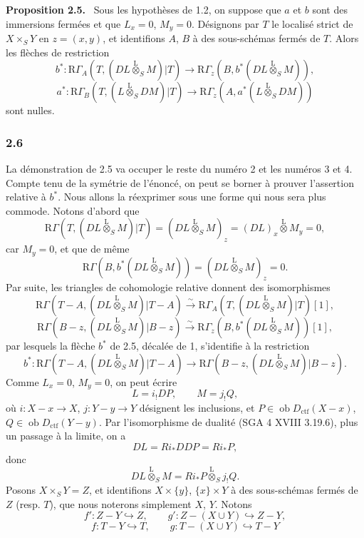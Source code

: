 \documentclass[11pt]{article}
\newenvironment{statement}[1]{\par\medskip\noindent\textbf{#1.}\ }{\par\medskip}
\providecommand{\lten}{\overset{\mathrm L}{\otimes}}
\providecommand{\Ob}{\operatorname{ob}}
\providecommand{\lten}{\overset{\mathrm L}{\otimes}}
\providecommand{\lten}{\overset{\mathrm L}{\otimes}}
\providecommand{\Ob}{\operatorname{ob}}
\providecommand{\lten}{\overset{\mathrm L}{\otimes}}
\providecommand{\lten}{\overset{\mathrm L}{\otimes}}
\providecommand{\Ob}{\operatorname{Ob}}
\providecommand{\lten}{\overset{\mathrm L}{\otimes}}
\providecommand{\Ob}{\operatorname{ob}}
\providecommand{\Ob}{\operatorname{Ob}}
\providecommand{\lten}{\overset{\mathrm L}{\otimes}}
\begin{document}
\begin{statement}{Proposition 2.5}
Sous les hypothèses de 1.2, on suppose que $a$ et $b$ sont des immersions fermées et que $L_x=0$, $M_y=0$. Désignons par $T$ le localisé strict de $X\times_SY$ en $z=(x,y)$, et identifions $A$, $B$ à des sous-schémas fermés de $T$. Alors les flèches de restriction
\[
b^*:\mathrm R\Gamma_A(T,(DL\lten_SM)|T)
 \longrightarrow \mathrm R\Gamma_z(B,b^*(DL\lten_SM)),
\]
\[
a^*:\mathrm R\Gamma_B(T,(L\lten_SDM)|T)
 \longrightarrow \mathrm R\Gamma_z(A,a^*(L\lten_SDM))
\]
sont nulles.
\end{statement}

\subsubsection*{2.6}
La démonstration de 2.5 va occuper le reste du numéro 2 et les numéros 3 et 4. Compte tenu de la symétrie de l'énoncé, on peut se borner à prouver l'assertion relative à $b^*$. Nous allons la réexprimer sous une forme qui nous sera plus commode. Notons d'abord que
\[
\mathrm R\Gamma(T,(DL\lten_SM)|T)
 =(DL\lten_SM)_z
 =(DL)_x\lten M_y=0,
\]
car $M_y=0$, et que de même
\[
\mathrm R\Gamma(B,b^*(DL\lten_SM))
 =(DL\lten_SM)_z=0.
\]
Par suite, les triangles de cohomologie relative donnent des isomorphismes
\[
\mathrm R\Gamma(T-A,(DL\lten_SM)|T-A)
 \xrightarrow{\sim}
\mathrm R\Gamma_A(T,(DL\lten_SM)|T)[1],
\]
\[
\mathrm R\Gamma(B-z,(DL\lten_SM)|B-z)
 \xrightarrow{\sim}
\mathrm R\Gamma_z(B,b^*(DL\lten_SM))[1],
\]
par lesquels la flèche $b^*$ de 2.5, décalée de 1, s'identifie à la restriction
\begin{equation}
b^*:\mathrm R\Gamma(T-A,(DL\lten_SM)|T-A)
 \longrightarrow \mathrm R\Gamma(B-z,(DL\lten_SM)|B-z).
\tag{2.6.1}
\end{equation}
Comme $L_x=0$, $M_y=0$, on peut écrire
\begin{equation}
L=i_!DP,\qquad M=j_!Q,
\tag{2.6.2}
\end{equation}
où $i:X-x\to X$, $j:Y-y\to Y$ désignent les inclusions, et $P\in\Ob D_{\mathrm{ctf}}(X-x)$, $Q\in\Ob D_{\mathrm{ctf}}(Y-y)$. Par l'isomorphisme de dualité (SGA 4 XVIII 3.19.6), plus un passage à la limite, on a
\[
DL=Ri_*DDP=Ri_*P,
\]
donc
\[
DL\lten_SM=Ri_*P\lten_Sj_!Q.
\]
Posons $X\times_SY=Z$, et identifions $X\times\{y\}$, $\{x\}\times Y$ à des sous-schémas fermés de $Z$ (resp. $T$), que nous noterons simplement $X$, $Y$. Notons
\[
f':Z-Y\hookrightarrow Z,\qquad
g':Z-(X\cup Y)\hookrightarrow Z-Y,
\]
\[
f:T-Y\hookrightarrow T,\qquad
g:T-(X\cup Y)\hookrightarrow T-Y
\]
\end{document}
